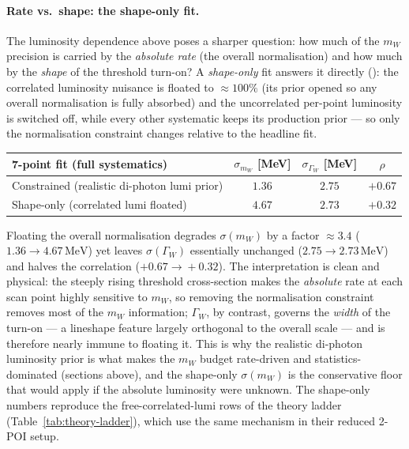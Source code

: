 \documentclass[11pt,a4paper]{article}
\newcommand{\code}[1]{\texttt{\detokenize{#1}}}
\newcommand{\mW}{m_W}
\newcommand{\GammaW}{\Gamma_W}
\newcommand{\MeV}{\ensuremath{\,\mathrm{MeV}}}
\begin{document}
\paragraph{Rate vs.\ shape: the shape-only fit.}
The luminosity dependence above poses a sharper question: how much of the $\mW$
precision is carried by the \emph{absolute rate} (the overall normalisation) and
how much by the \emph{shape} of the threshold turn-on? A \emph{shape-only} fit
answers it directly (\code{doFit_ww.py --shapeOnly}): the correlated luminosity
nuisance is floated to $\approx\!100\%$ (its prior opened so any overall
normalisation is fully absorbed) and the uncorrelated per-point luminosity is
switched off, while every other systematic keeps its production prior --- so only
the normalisation constraint changes relative to the headline fit.
%
\begin{center}
\begin{tabular}{l c c c}
\toprule
7-point fit (full systematics) & $\sigma_{\mW}$ [MeV] & $\sigma_{\GammaW}$ [MeV] & $\rho$ \\
\midrule
Constrained (realistic di-photon lumi prior) & $1.36$ & $2.75$ & $+0.67$ \\
Shape-only (correlated lumi floated)         & $4.67$ & $2.73$ & $+0.32$ \\
\bottomrule
\end{tabular}
\end{center}
%
Floating the overall normalisation degrades $\sigma(\mW)$ by a factor
$\approx\!3.4$ ($1.36\!\to\!4.67\MeV$) yet leaves $\sigma(\GammaW)$ essentially
unchanged ($2.75\!\to\!2.73\MeV$) and halves the correlation
($+0.67\!\to\!+0.32$). The interpretation is clean and physical: the steeply
rising threshold cross-section makes the \emph{absolute} rate at each scan point
highly sensitive to $\mW$, so removing the normalisation constraint removes most
of the $\mW$ information; $\GammaW$, by contrast, governs the \emph{width} of the
turn-on --- a lineshape feature largely orthogonal to the overall scale --- and
is therefore nearly immune to floating it. This is why the realistic di-photon
luminosity prior is what makes the $\mW$ budget rate-driven and
statistics-dominated (sections above), and the shape-only $\sigma(\mW)$ is the
conservative floor that would apply if the absolute luminosity were unknown. The
shape-only numbers reproduce the free-correlated-lumi rows of the theory ladder
(Table~\ref{tab:theory-ladder}), which use the same
mechanism in their reduced 2-POI setup.
\end{document}
